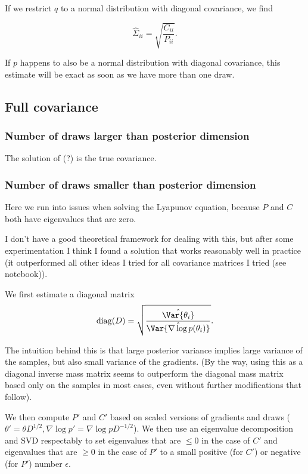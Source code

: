 \documentclass{scrartcl}
\DeclareMathOperator{\diag}{diag}
\begin{document}
If we restrict $q$ to a normal distribution with diagonal covariance, we find

$$
\hat{\Sigma}_{ii} = \sqrt{\frac{C_{ii}}{P_{ii}}}.
$$

If $p$ happens to also be a normal distribution with diagonal covariance, this
estimate will be exact as soon as we have more than one draw.

\subsection{Full covariance}
\subsubsection{Number of draws larger than posterior dimension}

The solution of (?) is the true covariance.

\subsubsection{Number of draws smaller than posterior dimension}

Here we run into issues when solving the Lyapunov equation, because $P$ and $C$ both
have eigenvalues that are zero.

I don't have a good theoretical framework for dealing with this, but after some
experimentation I think I found a solution that works reasonably well in
practice (it outperformed all other ideas I tried for all covariance matrices I
tried (see notebook)).

We first estimate a diagonal matrix
\[
\diag(D) = \sqrt{\frac{\hat{\Var{\theta_i}}}{\hat{\Var{\nabla \log p(\theta_i)}}}}.
\]

The intuition behind this is that large posterior variance implies large
variance of the samples, but also small variance of the gradients. (By the way,
using this as a diagonal inverse mass matrix seems to outperform the diagonal
mass matrix based only on the samples in most cases, even without further
modifications that follow).

We then compute $P'$ and $C'$ based on scaled versions of gradients and draws
($\theta' = \theta D^{1/2}, \nabla \log p' = \nabla \log p D^{-1/2}$).
We then use an eigenvalue decomposition and SVD respectably to set eigenvalues
that are $\leq 0$ in the case of $C'$ and eigenvalues that are $\geq 0$ in the case
of $P'$ to a small positive (for $C'$) or negative (for $P'$) number $\epsilon$.
\end{document}
